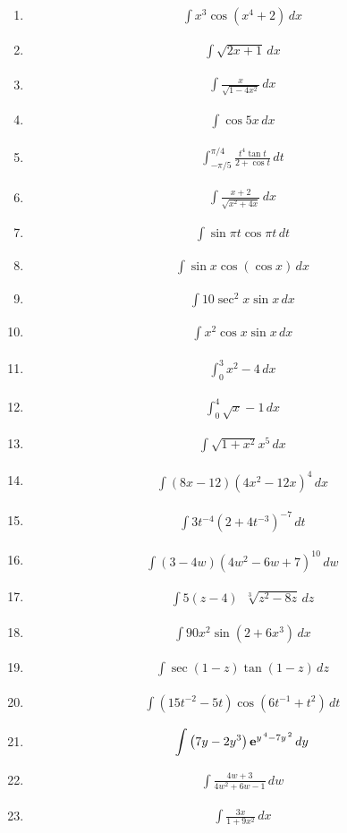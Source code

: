 \documentclass[twoside, fleqn,12pt,letterpaper]{book}
\newcommand{\makeitem}[2]{\item {#2}\begin{align*} {#1}
  \end{align*}}
\newcommand{\makeitemtextb}[1]{\makeitem{{#1}}{\cite{RosTextbook}}}
\newcommand{\makeitemlamar}[1]{\makeitem{{#1}}{\cite{lamar}}}
\begin{document}
\begin{multicols}{2}
\begin{enumerate}
 \makeitemtextb{\int x^3\cos{(x^4+2)} \, dx} 
 
 \makeitemtextb{\int \sqrt{2x+1} \, dx} 
 
 \makeitemtextb{\int \frac{x}{\sqrt{1-4x^2}} \, dx}
 
 \makeitemtextb{\int \cos{5x} \, dx}
  
  \makeitemtextb{\int_{-\pi/5}^{\pi/4} \frac{t^4\tan{t}}{2 + \cos{t}} \, dt} 
  
  \makeitemtextb{\int \frac{x+2}{\sqrt{x^2+4x}} \, dx}
  
  
  \makeitemtextb{\int \sin{\pi t} \cos{\pi t} \, dt}
  
  \makeitemtextb{\int \sin{x} \cos({\cos{x}}) \, dx }
  
  \makeitemtextb{\int 10\sec^2{x}\sin{x} \, dx}
  
  \makeitemtextb{\int x^2\cos{x}\sin{x} \, dx} 
  
  \makeitemtextb{\int_{0}^{3} x^2-4 \, dx} 
  
  \makeitemtextb{\int_{0}^{4} \sqrt{x}-1 \, dx} 
  
  \makeitemtextb{\int \sqrt{1+x^2} x^5 \, dx} 
  
  \makeitemlamar{\displaystyle \int   {{\left( {8x - 12} \right){{\left( {4{x^2} - 12x} \right)}^4}\,dx}}}
  
  \makeitemlamar{\displaystyle \int   {{3{t^{ - 4}}{{\left( {2 + 4{t^{ - 3}}} \right)}^{ - 7}}\,dt}}}
  
  \makeitemlamar{\displaystyle \int   {{\left( {3 - 4w} \right){{\left( {4{w^2} - 6w + 7} \right)}^{10}}\,dw}}}
  
  \makeitemlamar{\displaystyle \int   {{5\left( {z - 4} \right)\,\,\,\sqrt[3]{{{z^2} - 8z}}\,dz}}}
  
  \makeitemlamar{\displaystyle \int   {{90{x^2}\sin \left( {2 + 6{x^3}} \right)\,dx}}}
  
  \makeitemlamar{\displaystyle \int   {{\sec \left( {1 - z} \right)\tan \left( {1 - z} \right)\,dz}}}
  
  \makeitemlamar{\displaystyle \int   {{\left( {15{t^{ - 2}} - 5t} \right)\cos \left( {6{t^{ - 1}} + {t^2}} \right)\,dt}}}
  
  \makeitemlamar{\displaystyle \int   {{\left( {7y - 2{y^3}} \right){{\bf{e}}^{{y^{\,4}} - 7{y^{\,2}}}}\,dy}}}
  
  \makeitemlamar{\displaystyle \int   {{\frac{{4w + 3}}{{4{w^2} + 6w - 1}}\,dw}}}
  
  \makeitemlamar{\displaystyle \int   {{\frac{{3x}}{{1 + 9{x^2}}}\,dx}}} 
  

\end{enumerate}
\end{multicols}
\end{document}
